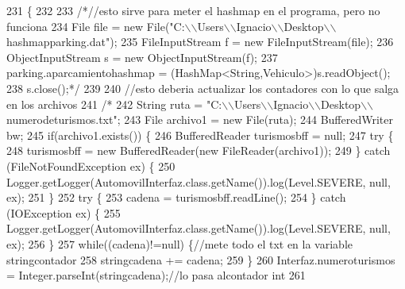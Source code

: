 \begin{DoxyCode}
231                                                                                      \{
232         
233         \textcolor{comment}{/*//esto sirve para meter el hashmap en el programa, pero no funciona}
234 \textcolor{comment}{        File file = new File("C:\(\backslash\)\(\backslash\)Users\(\backslash\)\(\backslash\)Ignacio\(\backslash\)\(\backslash\)Desktop\(\backslash\)\(\backslash\)hashmapparking.dat");}
235 \textcolor{comment}{        FileInputStream f = new FileInputStream(file);}
236 \textcolor{comment}{        ObjectInputStream s = new ObjectInputStream(f);}
237 \textcolor{comment}{        parking.aparcamientohashmap = (HashMap<String,Vehiculo>)s.readObject();}
238 \textcolor{comment}{        s.close();*/}
239         
240         \textcolor{comment}{//esto deberia actualizar los contadores con lo que salga en los archivos}
241         \textcolor{comment}{/*}
242 \textcolor{comment}{        String ruta = "C:\(\backslash\)\(\backslash\)Users\(\backslash\)\(\backslash\)Ignacio\(\backslash\)\(\backslash\)Desktop\(\backslash\)\(\backslash\)numerodeturismos.txt";}
243 \textcolor{comment}{        File archivo1 = new File(ruta);}
244 \textcolor{comment}{        BufferedWriter bw;}
245 \textcolor{comment}{        if(archivo1.exists()) \{}
246 \textcolor{comment}{            BufferedReader turismosbff = null;}
247 \textcolor{comment}{                    try \{}
248 \textcolor{comment}{                        turismosbff = new BufferedReader(new FileReader(archivo1));}
249 \textcolor{comment}{                    \} catch (FileNotFoundException ex) \{}
250 \textcolor{comment}{                        Logger.getLogger(AutomovilInterfaz.class.getName()).log(Level.SEVERE, null, ex);}
251 \textcolor{comment}{                    \}}
252 \textcolor{comment}{                    try \{}
253 \textcolor{comment}{                        cadena = turismosbff.readLine();}
254 \textcolor{comment}{                    \} catch (IOException ex) \{}
255 \textcolor{comment}{                        Logger.getLogger(AutomovilInterfaz.class.getName()).log(Level.SEVERE, null, ex);}
256 \textcolor{comment}{                    \}}
257 \textcolor{comment}{                while((cadena)!=null) \{//mete todo el txt en la variable stringcontador}
258 \textcolor{comment}{                        stringcadena += cadena;}
259 \textcolor{comment}{                    \}}
260 \textcolor{comment}{                Interfaz.numeroturismos = Integer.parseInt(stringcadena);//lo pasa alcontador int }
261 \textcolor{comment}{                }

\end{DoxyCode}
